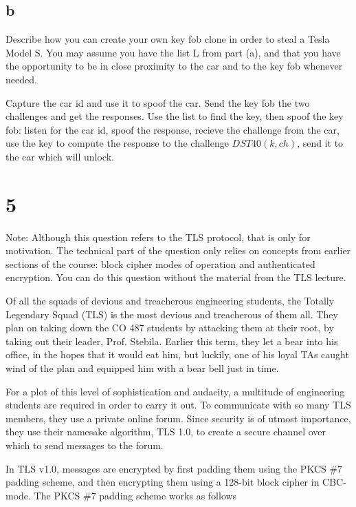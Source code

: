 \documentclass[11pt]{article}
\begin{document}
\subsection{b}

Describe how you can create your own key fob clone in order to steal a Tesla Model S. You may assume you have the list L from part (a), and that you have the opportunity to be in close proximity to the car and to the key fob whenever needed.

Capture the car id and use it to spoof the car. Send the key fob the two challenges and get the responses. Use the list to find the key, then spoof the key fob: listen for the car id, spoof the response, recieve the challenge from the car, use the key to compute the response to the challenge $DST40(k, ch)$, send it to the car which will unlock.

\newpage

\section{5}

Note: Although this question refers to the TLS protocol, that is only for motivation. The technical part of the question only relies on concepts from earlier sections of the course: block cipher modes of operation and authenticated encryption. You can do this question without the material from the TLS lecture.

Of all the squads of devious and treacherous engineering students, the Totally Legendary Squad (TLS) is the most devious and treacherous of them all. They plan on taking down the CO 487 students by attacking them at their root, by taking out their leader, Prof. Stebila. Earlier this term, they let a bear into his office, in the hopes that it would eat him, but luckily, one of his loyal TAs caught wind of the plan and equipped him with a bear bell just in time.

For a plot of this level of sophistication and audacity, a multitude of engineering students are required in order to carry it out. To communicate with so many TLS members, they use a private online forum. Since security is of utmost importance, they use their namesake algorithm, TLS 1.0, to create a secure channel over which to send messages to the forum.

In TLS v1.0, messages are encrypted by first padding them using the PKCS $\#7$ padding scheme, and then encrypting them using a 128-bit block cipher in CBC-mode. The PKCS $\#7$ padding scheme works as follows
\end{document}
